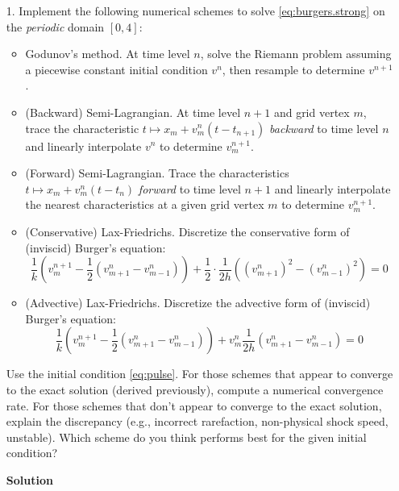 \documentclass{article}
\begin{document}
\begin{itemize}

\item[1.] Implement the following numerical schemes to solve \eqref{eq:burgers.strong} on the \emph{periodic} domain $[0,4]$:
\begin{itemize}
\item Godunov's method. At time level $n$, solve the Riemann problem assuming a piecewise constant initial condition $v^n$, then resample to determine $v^{n+1}$.
\item (Backward) Semi-Lagrangian. At time level $n+1$ and grid vertex $m$, trace the characteristic $t \mapsto x_m + v^n_m \left( t - t_{n+1} \right)$ \emph{backward} to time level $n$ and linearly interpolate $v^n$ to determine $v^{n+1}_m$.
\item (Forward) Semi-Lagrangian. Trace the characteristics $t \mapsto x_m + v^n_m \left( t - t_n \right)$ \emph{forward} to time level $n+1$ and linearly interpolate the nearest characteristics at a given grid vertex $m$ to determine $v^{n+1}_m$.
\item (Conservative) Lax-Friedrichs. Discretize the conservative form of (inviscid) Burger's equation:
\begin{equation*}
\frac{1}{k} \left( v^{n+1}_m - \frac{1}{2} \left( v^n_{m+1} - v^n_{m-1} \right) \right) + \frac{1}{2} \cdot \frac{1}{2h} \left( \left( v^n_{m+1} \right)^2 - \left( v^n_{m-1} \right)^2 \right) = 0
\end{equation*}
\item (Advective) Lax-Friedrichs. Discretize the advective form of (inviscid) Burger's equation:
\begin{equation*}
\frac{1}{k} \left( v^{n+1}_m - \frac{1}{2} \left( v^n_{m+1} - v^n_{m-1} \right) \right) + v^n_m \frac{1}{2h} \left( v^n_{m+1} - v^n_{m-1} \right) = 0
\end{equation*}
\end{itemize}
Use the initial condition \eqref{eq:pulse}. For those schemes that appear to converge to the exact solution (derived previously), compute a numerical convergence rate. For those schemes that don't appear to converge to the exact solution, explain the discrepancy (e.g., incorrect rarefaction, non-physical shock speed, unstable). Which scheme do you think performs best for the given initial condition?

\textbf{Solution}


\end{itemize}
\end{document}
